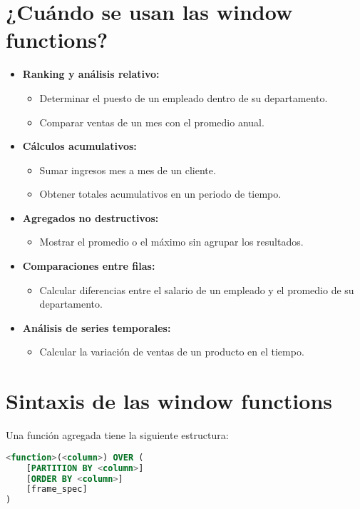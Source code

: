 \section{¿Cuándo se usan las window functions?}

\begin{itemize}
    \item \textbf{Ranking y análisis relativo:}
    \begin{itemize}
        \item Determinar el puesto de un empleado dentro de su departamento.
        \item Comparar ventas de un mes con el promedio anual.
    \end{itemize}
    \item \textbf{Cálculos acumulativos:}
    \begin{itemize}
        \item Sumar ingresos mes a mes de un cliente.
        \item Obtener totales acumulativos en un periodo de tiempo.
    \end{itemize}
    \item \textbf{Agregados no destructivos:}
    \begin{itemize}
        \item Mostrar el promedio o el máximo sin agrupar los resultados.
    \end{itemize}
    \item \textbf{Comparaciones entre filas:}
    \begin{itemize}
        \item Calcular diferencias entre el salario de un empleado y
        el promedio de su departamento.
    \end{itemize}
    \item \textbf{Análisis de series temporales:}
    \begin{itemize}
        \item Calcular la variación de ventas de un producto en el tiempo.
    \end{itemize}
\end{itemize}

\section{Sintaxis de las window functions}

Una función agregada tiene la siguiente estructura:

\begin{lstlisting}[language=SQL]
<function>(<column>) OVER (
    [PARTITION BY <column>]
    [ORDER BY <column>]
    [frame_spec]
)
\end{lstlisting}

